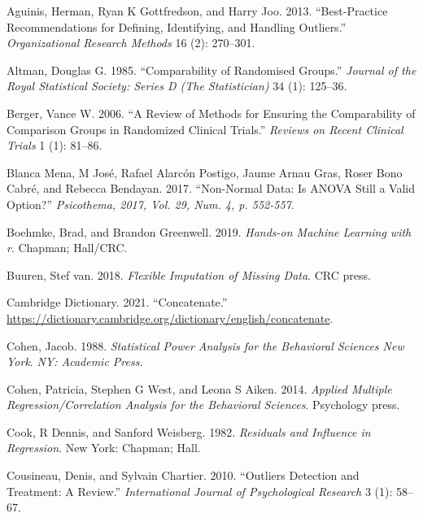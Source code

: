 \documentclass[
  letterpaper,
]{krantz}
\newlength{\cslhangindent}
\newenvironment{CSLReferences}[2] %
 {\begin{list}{}{%
  \setlength{\itemindent}{0pt}
  \setlength{\leftmargin}{0pt}
  \setlength{\parsep}{0pt}
  \ifodd #1
   \setlength{\leftmargin}{\cslhangindent}
   \setlength{\itemindent}{-1\cslhangindent}
  \fi
  \setlength{\itemsep}{#2\baselineskip}}}
 {\end{list}}
\begin{document}
\label{refs}
\begin{CSLReferences}{1}{0}
Aguinis, Herman, Ryan K Gottfredson, and Harry Joo. 2013.
{``Best-Practice Recommendations for Defining, Identifying, and Handling
Outliers.''} \emph{Organizational Research Methods} 16 (2): 270--301.

Altman, Douglas G. 1985. {``Comparability of Randomised Groups.''}
\emph{Journal of the Royal Statistical Society: Series D (The
Statistician)} 34 (1): 125--36.

Berger, Vance W. 2006. {``A Review of Methods for Ensuring the
Comparability of Comparison Groups in Randomized Clinical Trials.''}
\emph{Reviews on Recent Clinical Trials} 1 (1): 81--86.

Blanca Mena, M José, Rafael Alarcón Postigo, Jaume Arnau Gras, Roser
Bono Cabré, and Rebecca Bendayan. 2017. {``Non-Normal Data: Is ANOVA
Still a Valid Option?''} \emph{Psicothema, 2017, Vol. 29, Num. 4, p.
552-557}.

Boehmke, Brad, and Brandon Greenwell. 2019. \emph{Hands-on Machine
Learning with r}. Chapman; Hall/CRC.

Buuren, Stef van. 2018. \emph{Flexible Imputation of Missing Data}. CRC
press.

Cambridge Dictionary. 2021. {``Concatenate.''}
\url{https://dictionary.cambridge.org/dictionary/english/concatenate}.

Cohen, Jacob. 1988. \emph{Statistical Power Analysis for the Behavioral
Sciences New York}. \emph{NY: Academic Press}.

Cohen, Patricia, Stephen G West, and Leona S Aiken. 2014. \emph{Applied
Multiple Regression/Correlation Analysis for the Behavioral Sciences}.
Psychology press.

Cook, R Dennis, and Sanford Weisberg. 1982. \emph{Residuals and
Influence in Regression}. New York: Chapman; Hall.

Cousineau, Denis, and Sylvain Chartier. 2010. {``Outliers Detection and
Treatment: A Review.''} \emph{International Journal of Psychological
Research} 3 (1): 58--67.


\end{CSLReferences}
\end{document}
